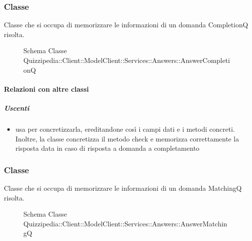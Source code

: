 \subsubsection{Classe }
Classe che si occupa di memorizzare le informazioni di un domanda CompletionQ risolta.
\begin{figure}[H]
\centering
\noindent{}
\caption[Schema Classe AnswerCompletionQ]{Schema Classe Quizzipedia::Client::ModelClient::Services::Answers::AnswerCompletionQ}
\end{figure}
\paragraph{Relazioni con altre classi}
\subparagraph{Uscenti}
\begin{itemize}
\item usa  per concretizzarla, ereditandone così i campi dati e i metodi concreti. Inoltre, la classe concretizza il metodo check e memorizza correttamente la risposta data in caso di risposta a domanda a completamento
\end{itemize}
\subsubsection{Classe }
Classe che si occupa di memorizzare le informazioni di un domanda MatchingQ risolta.
\begin{figure}[H]
\centering
\noindent{}
\caption[Schema Classe AnswerMatchingQ]{Schema Classe Quizzipedia::Client::ModelClient::Services::Answers::AnswerMatchingQ}
\end{figure}

